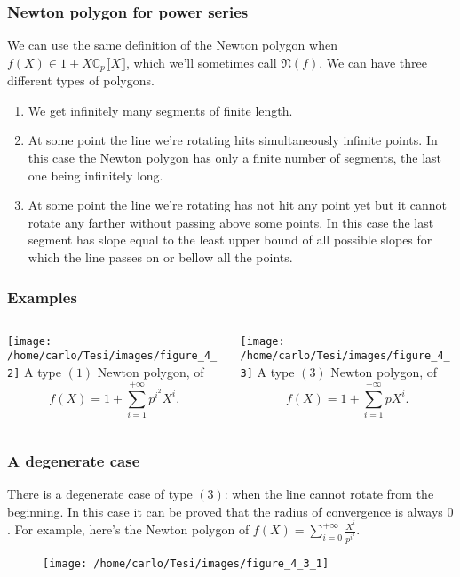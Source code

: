 \documentclass{beamer}
\newcommand{\C}{ \mathbb{C} }
\newcommand{\Cp}{ \C_p }
\newcommand{\ser}[1]{ \llbracket {#1} \rrbracket } %
\theoremstyle{plain}
\begin{document}
	\begin{frame}
		\frametitle{Newton polygon for power series}
		We can use the same definition of the Newton polygon when $f(X) \in 1 + X\Cp\ser{X}$, which we'll sometimes call $\mathfrak{N}(f)$. We can have three different types of polygons.
		\begin{enumerate}[<+->]
			\item We get infinitely many segments of finite length.
			\item At some point the line we're rotating hits simultaneously infinite points. In this case the Newton polygon has only a finite number of segments, the last one being infinitely long.
			\item At some point the line we're rotating has not hit any point yet but it cannot rotate any farther without passing above some points. In this case the last segment has slope equal to the least upper bound of all possible slopes for which the line passes on or bellow all the points.
		\end{enumerate}
	\end{frame}
	\begin{frame}
		\frametitle{Examples}
		\begin{columns}
			\begin{column}{0.5\textwidth}
				\texttt{[image: /home/carlo/Tesi/images/figure\_4\_2]} \newline
				A type $(1)$ Newton polygon, of
				\[
				f(X) = 1 + \sum_{i=1}^{+\infty} p^{i^2}X^i.
				\] 
			\end{column}
			\begin{column}{0.5\textwidth}
				\texttt{[image: /home/carlo/Tesi/images/figure\_4\_3]}
				A type $(3)$ Newton polygon, of
				\[	
				f(X) = 1 + \sum_{i=1}^{+\infty} pX^i.
				\]
			\end{column}
		\end{columns}
	\end{frame}
	\begin{frame}
		\frametitle{A degenerate case}
		There is a degenerate case of type $(3)$: when the line cannot rotate from the beginning. In this case it can be proved that the radius of convergence is always $0$. For example, here's the Newton polygon of $f(X) = \sum_{i=0}^{+\infty} \tfrac{X^i}{p^{i^2}}$.
		\begin{figure}[H]
			\texttt{[image: /home/carlo/Tesi/images/figure\_4\_3\_1]}
		\end{figure}
	\end{frame}
\end{document}
